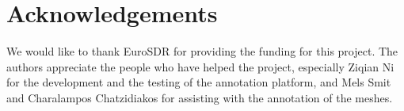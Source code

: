 \section{Acknowledgements}\label{sec:acknowledgements} 
We would like to thank EuroSDR for providing the funding for this project.
The authors appreciate the people who have helped the project, especially Ziqian Ni for the development and the testing of the annotation platform, and Mels Smit and Charalampos Chatzidiakos for assisting with the annotation of the meshes.

